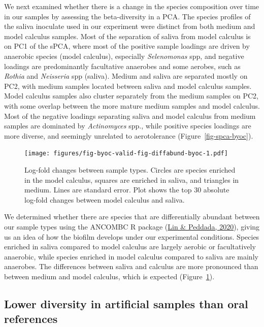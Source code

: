 \documentclass[
  letterpaper,
]{book}
\begin{document}
We next examined whether there is a change in the species composition
over time in our samples by assessing the beta-diversity in a PCA. The
species profiles of the saliva inoculate used in our experiment were
distinct from both medium and model calculus samples. Most of the
separation of saliva from model calculus is on PC1 of the sPCA, where
most of the positive sample loadings are driven by anaerobic species
(model calculus), especially \emph{Selenomonas} spp, and negative
loadings are predominantly facultative anaerobes and some aerobes, such
as \emph{Rothia} and \emph{Neisseria} spp (saliva). Medium and saliva
are separated mostly on PC2, with medium samples located between saliva
and model calculus samples. Model calculus samples also cluster
separately from the medium samples on PC2, with some overlap between the
more mature medium samples and model calculus. Most of the negative
loadings separating saliva and model calculus from medium samples are
dominated by \emph{Actinomyces} spp., while positive species loadings
are more diverse, and seemingly unrelated to aerotolerance
(Figure~\ref{fig-spca-byoc}).

\begin{figure}

{\centering \texttt{[image: figures/fig-byoc-valid-fig-diffabund-byoc-1.pdf]}

}

\caption{\label{fig-diffabund-byoc}Log-fold changes between sample
types. Circles are species enriched in the model calculus, squares are
enriched in saliva, and triangles in medium. Lines are standard error.
Plot shows the top 30 absolute log-fold changes between model calculus
and saliva.}

\end{figure}

We determined whether there are species that are differentially abundant
between our sample types using the ANCOMBC R package
(\protect\hyperlink{ref-linANCOMBC2020}{Lin \& Peddada, 2020}), giving
us an idea of how the biofilm develops under our experimental
conditions. Species enriched in saliva compared to model calculus are
largely aerobic or facultatively anaerobic, while species enriched in
model calculus compared to saliva are mainly anaerobes. The differences
between saliva and calculus are more pronounced than between medium and
model calculus, which is expected (Figure~\ref{fig-diffabund-byoc}).

\hypertarget{lower-diversity-in-artificial-samples-than-oral-references}{%
\subsection{Lower diversity in artificial samples than oral
references}\label{lower-diversity-in-artificial-samples-than-oral-references}}
\end{document}
